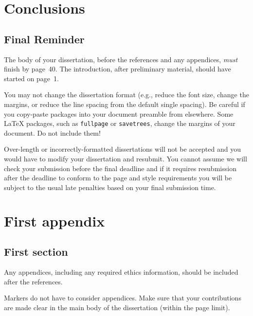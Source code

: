 \documentclass[logo,bsc,singlespacing,parskip,online]{infthesis}
\begin{document}
\chapter{Conclusions}

\section{Final Reminder}

The body of your dissertation, before the references and any appendices,
\emph{must} finish by page~40. The introduction, after preliminary material,
should have started on page~1.

You may not change the dissertation format (e.g., reduce the font size, change
the margins, or reduce the line spacing from the default single spacing). Be
careful if you copy-paste packages into your document preamble from elsewhere.
Some \LaTeX{} packages, such as \texttt{fullpage} or \texttt{savetrees}, change
the margins of your document. Do not include them!

Over-length or incorrectly-formatted dissertations will not be accepted and you
would have to modify your dissertation and resubmit. You cannot assume we will
check your submission before the final deadline and if it requires resubmission
after the deadline to conform to the page and style requirements you will be
subject to the usual late penalties based on your final submission time.

% 

% 



\appendix

\chapter{First appendix}

\section{First section}

Any appendices, including any required ethics information, should be included
after the references.

Markers do not have to consider appendices. Make sure that your contributions
are made clear in the main body of the dissertation (within the page limit).
\end{document}
